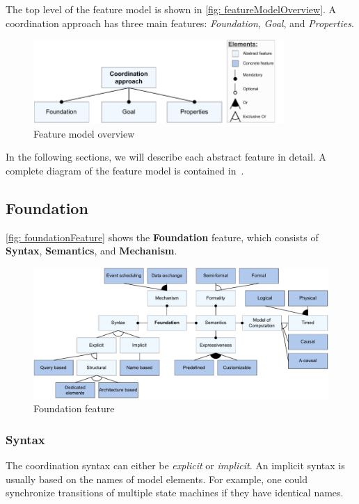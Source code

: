 \documentclass[runningheads]{llncs}
\begin{document}
The top level of the feature model is shown in \autoref{fig: featureModelOverview}.
A coordination approach has three main features: \textit{Foundation}, \textit{Goal}, and \textit{Properties}.

\begin{figure}[ht]
	\centering
	\includegraphics[width=0.85\textwidth]{images/root}
	\caption{Feature model overview}
	\label{fig: featureModelOverview}
\end{figure}

In the following sections, we will describe each abstract feature in detail.
A complete diagram of the feature model is contained in~\cite{timkrauterArtifactsCoordination2024}.

\subsection{Foundation}

\autoref{fig: foundationFeature} shows the \textbf {Foundation} feature, which consists of \textbf{Syntax}, \textbf{Semantics}, and \textbf{Mechanism}.

\begin{figure}[ht]
	\centering
	\includegraphics[width=1\textwidth]{images/foundation_feature}
	\caption{Foundation feature}
	\label{fig: foundationFeature}
\end{figure}

\subsubsection{Syntax} The coordination syntax can either be \textit{explicit} or \textit{implicit}.
An implicit syntax is usually based on the names of model elements.
For example, one could synchronize transitions of multiple state machines if they have identical names.
\end{document}
